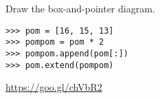 \begin{blocksection}
\question Draw the box-and-pointer diagram.

\begin{lstlisting}
>>> pom = [16, 15, 13]
>>> pompom = pom * 2
>>> pompom.append(pom[:])
>>> pom.extend(pompom)
\end{lstlisting}

\begin{solution}[1in]
\url{https://goo.gl/chVbR2}
\end{solution}
\end{blocksection}
